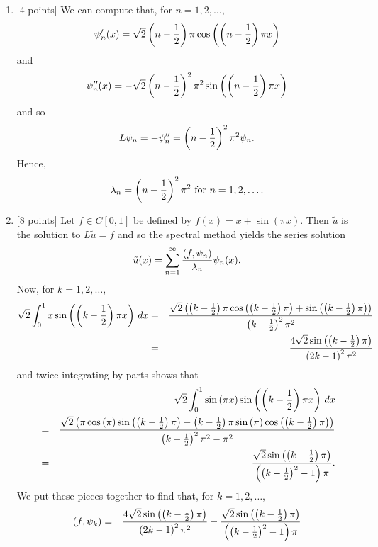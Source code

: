 \begin{solution}
\def\uhat{\widehat{u}}
\begin{enumerate}
\item {[4 points]} We can compute that, for $n=1,2,\ldots$,
\[
\psi_n'(x)=\sqrt{2} \left(n-{1\over 2}\right) \pi \cos\left(\left(n-{1\over 2}\right) \pi x\right)
\]
and
\[
\psi_n''(x)=-\sqrt{2} \left(n-{1\over 2}\right)^2 \pi^2 \sin\left(\left(n-{1\over 2}\right) \pi x\right)
\]
and so
\[
L\psi_n=-\psi_n''=\left(n-{1\over 2}\right)^2 \pi^2\psi_n.
\]
Hence,
\[
\lambda_n = \left(n-{1\over 2}\right)^2 \pi^2\mbox{ for } n = 1, 2, \ldots.
\]

\item {[8 points]} Let $f\in C[0,1]$ be defined by $f(x)=x+\sin(\pi x)$. Then $\tilde{u}$ is the solution to $L\tilde{u}=f$ and so the spectral method yields the series solution
\[
\tilde{u}(x)=\sum_{n=1}^\infty{(f,\psi_n)\over\lambda_n}\psi_n(x).
\]
Now, for $k=1,2,\ldots$,
     \begin{eqnarray*} 
          \sqrt{2} \int_0^1 x \sin\left(\left(k-{1\over2}\right)\pi x\right) \, dx
                      &=& {\sqrt{2}\left(\left(k-{1\over2}\right)\pi\cos\left(\left(k-{1\over2}\right)\pi\right)+\sin\left(\left(k-{1\over2}\right)\pi\right)\right)
                               \over \left(k-{1\over2}\right)^2\pi^2}
\\
                      &=& {4\sqrt{2}\sin\left(\left(k-{1\over2}\right)\pi\right) \over \left(2k-1\right)^2\pi^2}
     \end{eqnarray*}
     and twice integrating by parts shows that
\begin{eqnarray*}
&&\sqrt{2} \int_0^1 \sin\left(\pi x\right) \sin\left(\left(k-{1\over2}\right)\pi x\right) \, dx 
\\
&=& {\sqrt{2}\left(\pi \cos\left(\pi\right)\sin\left(\left(k-{1\over2}\right)\pi\right) - \left(k-{1\over2}\right)\pi\sin\left(\pi\right)\cos\left(\left(k-{1\over2}\right)\pi\right)\right)
                    \over \left(k-{1\over2}\right)^2\pi^2-\pi^2}
\\
&=& -{\sqrt{2} \sin\left(\left(k-{1\over2}\right)\pi\right) \over \left(\left(k-{1\over2}\right)^2-1\right)\pi}.
\end{eqnarray*}
We put these pieces together to find that, for $k=1,2,\ldots$,
\begin{eqnarray*}
\ip{f, \psi_k} &=& {4\sqrt{2}\sin\left(\left(k-{1\over2}\right)\pi\right) \over \left(2k-1\right)^2\pi^2}-{\sqrt{2} \sin\left(\left(k-{1\over2}\right)\pi\right) \over \left(\left(k-{1\over2}\right)^2-1\right)\pi}

\end{eqnarray*}
\end{enumerate}
\end{solution}
